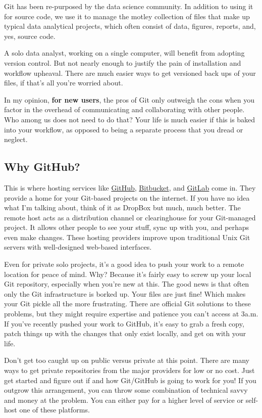 \documentclass[]{book}
\theoremstyle{definition}
\theoremstyle{definition}
\theoremstyle{remark}
\begin{document}
Git has been re-purposed by the data science community. In addition to
using it for source code, we use it to manage the motley collection of
files that make up typical data analytical projects, which often consist
of data, figures, reports, and, yes, source code.

A solo data analyst, working on a single computer, will benefit from
adopting version control. But not nearly enough to justify the pain of
installation and workflow upheaval. There are much easier ways to get
versioned back ups of your files, if that's all you're worried about.

In my opinion, \textbf{for new users}, the pros of Git only outweigh the
cons when you factor in the overhead of communicating and collaborating
with other people. Who among us does not need to do that? Your life is
much easier if this is baked into your workflow, as opposed to being a
separate process that you dread or neglect.

\subsection{Why GitHub?}\label{why-github}

This is where hosting services like \href{https://github.com}{GitHub},
\href{https://bitbucket.org}{Bitbucket}, and
\href{https://about.gitlab.com}{GitLab} come in. They provide a home for
your Git-based projects on the internet. If you have no idea what I'm
talking about, think of it as DropBox but much, much better. The remote
host acts as a distribution channel or clearinghouse for your
Git-managed project. It allows other people to see your stuff, sync up
with you, and perhaps even make changes. These hosting providers improve
upon traditional Unix Git servers with well-designed web-based
interfaces.

Even for private solo projects, it's a good idea to push your work to a
remote location for peace of mind. Why? Because it's fairly easy to
screw up your local Git repository, especially when you're new at this.
The good news is that often only the Git infrastructure is borked up.
Your files are just fine! Which makes your Git pickle all the more
frustrating. There are official Git solutions to these problems, but
they might require expertise and patience you can't access at 3a.m. If
you've recently pushed your work to GitHub, it's easy to grab a fresh
copy, patch things up with the changes that only exist locally, and get
on with your life.

Don't get too caught up on public versus private at this point. There
are many ways to get private repositories from the major providers for
low or no cost. Just get started and figure out if and how Git/GitHub is
going to work for you! If you outgrow this arrangement, you can throw
some combination of technical savvy and money at the problem. You can
either pay for a higher level of service or self-host one of these
platforms.
\end{document}
